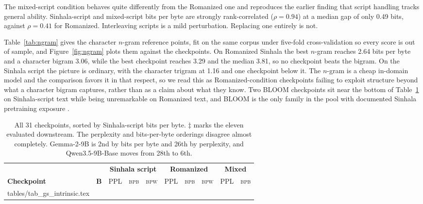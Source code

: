 \documentclass{article}
\makeatletter
\newcommand{\bpb}{\textsc{bpb}}
\newcommand{\bpw}{\textsc{bpw}}
\newcommand{\rows}[1]{\@@input #1 }
\makeatother
\begin{document}
The mixed-script condition behaves quite differently from the Romanized one and
reproduces the earlier finding that script handling tracks general ability.
Sinhala-script and mixed-script bits per byte are strongly rank-correlated
($\rho = 0.94$) at a median gap of only 0.49 bits, against $\rho = 0.41$ for
Romanized. Interleaving scripts is a mild perturbation. Replacing one entirely is not.

Table~\ref{tab:ngram} gives the character $n$-gram reference points, fit on the same
corpus under five-fold cross-validation so every score is out of sample, and
Figure~\ref{fig:ngram} plots them against the checkpoints. On Romanized Sinhala the
best $n$-gram reaches 2.64 bits per byte and a character bigram 3.06, while the best
checkpoint reaches 3.29 and the median 3.81, so no checkpoint beats the bigram. On
the Sinhala script the picture is ordinary, with the character trigram at 1.16 and one
checkpoint below it. The $n$-gram is a cheap in-domain model and the comparison
favors it in that respect, so we read this as Romanized-condition checkpoints failing
to exploit structure beyond what a character bigram captures, rather than as a claim
about what they know. Two BLOOM checkpoints sit near the bottom of
Table~\ref{tab:intrinsic} on Sinhala-script text while being unremarkable on
Romanized text, and BLOOM is the only family in the pool with documented Sinhala
pretraining exposure \citep{lescao-etal-2023-bloom}.

\begin{table}[t]
\caption{All 31 checkpoints, sorted by Sinhala-script bits per byte. $\ddagger$ marks
the eleven evaluated downstream. The perplexity and bits-per-byte orderings disagree
almost completely. Gemma-2-9B is 2nd by bits per byte and 26th by perplexity, and
Qwen3.5-9B-Base moves from 28th to 6th.}
\label{tab:intrinsic}
\centering\scriptsize
\setlength{\tabcolsep}{3pt}
\begin{tabular}{@{}lr rrr rrr rr@{}}
\toprule
& & \multicolumn{3}{c}{\textbf{Sinhala script}}
& \multicolumn{3}{c}{\textbf{Romanized}}
& \multicolumn{2}{c}{\textbf{Mixed}} \\
\cmidrule(lr){3-5}\cmidrule(lr){6-8}\cmidrule(lr){9-10}
\textbf{Checkpoint} & \textbf{B} & PPL & \bpb{} & \bpw{}
& PPL & \bpb{} & \bpw{} & PPL & \bpb{} \\
\midrule
\rows{tables/tab_gs_intrinsic.tex}
\bottomrule
\end{tabular}
\end{table}
\end{document}
